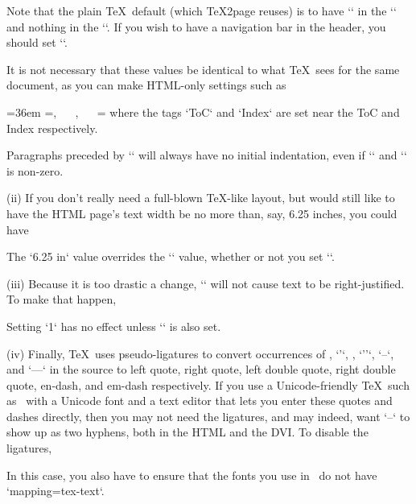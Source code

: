 Note that the plain \TeX\ default (which
\TeX2page reuses) is to have `\folio` in the
`\footline` and nothing in the `\headline`.  If you wish
to have a navigation bar in the header, you should set
`\headline`.

It is not necessary that these values be
identical to what \TeX\ sees for the same document, as you can
make HTML-only settings such as

%
\begintt
\ifx\shipout\UnDeFiNeD
  \hsize=36em
  \headline={\folio, ~~ , ~~ }
  \footline={\the\headline}  %
\fi
\endtt
%
 where the tags `ToC` and `Index` are set near
the ToC and Index respectively.

%
Paragraphs preceded by `\noindent` will always have no initial
indentation, even if `` and `\parskip` is
non-zero.

%
\item(ii) If you don’t really need a full-blown \TeX-like layout, but would
still like to have the HTML page’s text width be no more than,
say, 6.25 inches, you could have

\begintt
\def\TZPhsize{6.25 in}
\endtt
%
The `\TZPhsize` value overrides the `\hsize` value, whether
or not you set `\TZPtexlayout`.

\item(iii) Because it is too drastic a change, `` will not cause
text to be right-justified.  To make that happen,

\begintt
\let\TZPrightjustify=1
\endtt
%
Setting `\TZPrightjustify` has no effect unless `\TZPtexlayout` is
also set.

\item(iv) Finally, \TeX\ uses pseudo-ligatures to convert occurrences of , `'`, , `''`, `--`, and `---`
in the source to left quote, right quote, left double quote, right double quote, en-dash, and em-dash respectively.
If you use a Unicode-friendly \TeX\ such as \XeTeX\ with a Unicode font and a text editor that lets you enter these quotes and dashes directly, then you may
not need the ligatures, and may indeed, want `--` to show up as two hyphens, both in the HTML and the DVI.  To disable the ligatures,

\begintt
\let\TZPtextext=0
\endtt
%
In this case, you also have to ensure that the fonts you use in \XeTeX\ do not have `mapping=tex-text`.


